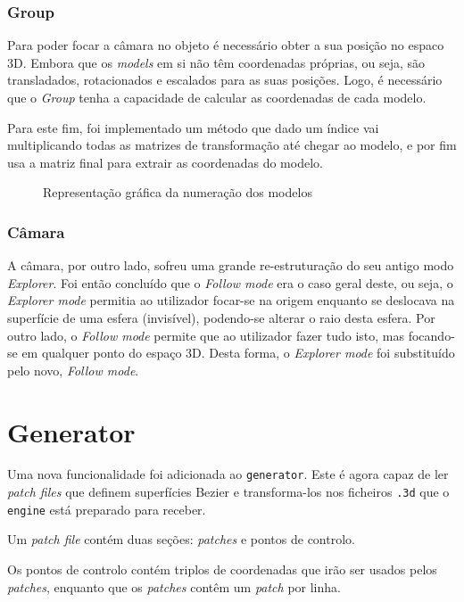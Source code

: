 \documentclass[a4paper]{article}
\begin{document}
\subsubsection{Group}

Para poder focar a câmara no objeto é necessário obter a sua posição no espaco 3D. Embora que os
\textit{models} em si não têm coordenadas próprias, ou seja, são transladados, rotacionados e escalados para as suas posições. Logo, é necessário que o \textit{Group} tenha a capacidade de calcular as coordenadas de cada modelo.

Para este fim, foi implementado um método que dado um índice vai multiplicando todas as matrizes de transformação até chegar ao modelo, e por fim usa a matriz final para extrair as coordenadas do modelo.

\begin{figure}[H]
    \centering
    
    \caption{Representação gráfica da numeração dos modelos}
\end{figure}

\subsubsection{Câmara}

A câmara, por outro lado, sofreu uma grande re-estruturação do seu antigo modo \textit{Explorer}.
Foi então concluído que o \textit{Follow mode} era o caso geral deste, ou seja, o \textit{Explorer mode}
permitia ao utilizador focar-se na origem enquanto se deslocava na superfície de uma esfera (invisível), podendo-se alterar o raio desta esfera. Por outro lado, o \textit{Follow mode} permite
que ao utilizador fazer tudo isto, mas focando-se em qualquer ponto do espaço 3D. Desta forma, o \textit{Explorer mode} foi substituído pelo novo, \textit{Follow mode}.

\section{Generator}

Uma nova funcionalidade foi adicionada ao \texttt{generator}. Este é agora capaz de ler \textit{patch files} que definem superfícies Bezier e transforma-los nos ficheiros \texttt{.3d} que o \texttt{engine} está preparado para receber.

Um \textit{patch file} contém duas seções: \textit{patches} e pontos de controlo.

Os pontos de controlo contém triplos de coordenadas que irão ser usados pelos \textit{patches}, enquanto que os \textit{patches} contêm um \textit{patch} por linha.
\end{document}
